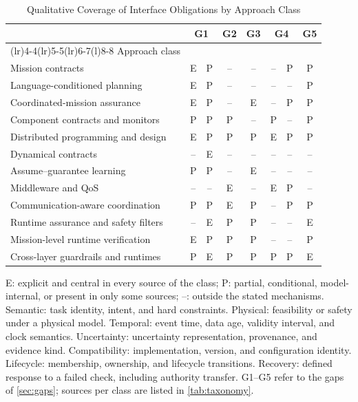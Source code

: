 \begin{table}[htbp]
  \centering
  \caption{Qualitative Coverage of Interface Obligations by Approach Class}
  \label{tab:coverage}
  \footnotesize
  \setlength{\tabcolsep}{2.4pt}
  \newcommand{\colhead}[1]{\rotatebox{90}{#1}}
  \begin{tabular}{@{}>{\raggedright\arraybackslash}p{}*{7}{c}@{}}
    \toprule
    & \multicolumn{2}{c}{G1} & G2 & G3 & \multicolumn{2}{c}{G4} & G5 \\
    \cmidrule(lr){2-3}\cmidrule(lr){4-4}\cmidrule(lr){5-5}\cmidrule(lr){6-7}\cmidrule(l){8-8}
    Approach class & \colhead{Semantic} & \colhead{Physical} & \colhead{Temporal}
      & \colhead{Uncertainty} & \colhead{Compatibility} & \colhead{Lifecycle}
      & \colhead{Recovery} \\
    \midrule
    Mission contracts                    & E  & P  & -- & -- & -- & P  & P  \\
    Language-conditioned planning        & E  & P  & -- & -- & -- & -- & P  \\
    Coordinated-mission assurance        & E  & P  & -- & E  & -- & P  & P  \\
    Component contracts and monitors     & P  & P  & P  & -- & P  & -- & P  \\
    Distributed programming and design   & E  & P  & P  & P  & E  & P  & P  \\
    Dynamical contracts                  & -- & E  & -- & -- & -- & -- & -- \\
    Assume--guarantee learning           & P  & P  & -- & E  & -- & -- & -- \\
    Middleware and QoS                   & -- & -- & E  & -- & E  & P  & -- \\
    Communication-aware coordination     & P  & P  & E  & P  & -- & P  & P  \\
    Runtime assurance and safety filters & -- & E  & P  & P  & -- & -- & E  \\
    Mission-level runtime verification   & E  & P  & P  & P  & -- & -- & P  \\
    Cross-layer guardrails and runtimes  & P  & E  & P  & P  & P  & P  & E  \\
    \bottomrule
  \end{tabular}

  \vspace{3pt}
  \parbox{\columnwidth}{\footnotesize E: explicit and central in every source of
  the class; P: partial, conditional, model-internal, or present in only some
  sources; --: outside the stated mechanisms.  Semantic: task identity, intent,
  and hard constraints.  Physical: feasibility or safety under a physical model.
  Temporal: event time, data age, validity interval, and clock semantics.
  Uncertainty: uncertainty representation, provenance, and evidence kind.
  Compatibility: implementation, version, and configuration identity.
  Lifecycle: membership, ownership, and lifecycle transitions.  Recovery:
  defined response to a failed check, including authority transfer.  G1--G5
  refer to the gaps of \cref{sec:gaps}; sources per class are listed in
  \cref{tab:taxonomy}.}
\end{table}
